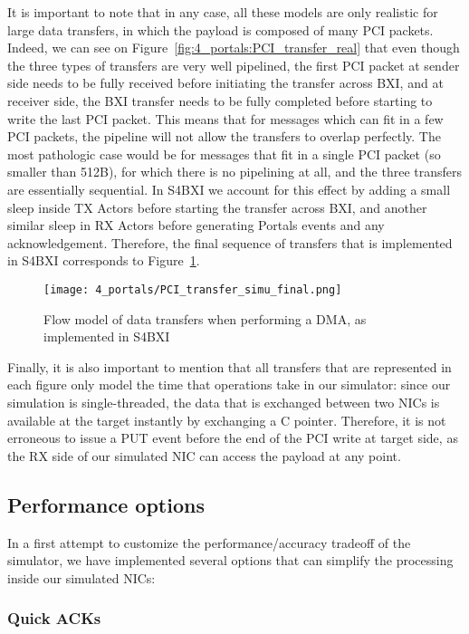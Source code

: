 It is important to note that in any case, all these models are only realistic
for large data transfers, in which the payload is composed of many PCI packets.
Indeed, we can see on Figure~\ref{fig:4_portals:PCI_transfer_real} that even
though the three types of transfers are very well pipelined, the first PCI
packet at sender side needs to be fully received before initiating the transfer
across BXI, and at receiver side, the BXI transfer needs to be fully completed
before starting to write the last PCI packet. This means that for messages which
can fit in a few PCI packets, the pipeline will not allow the transfers to
overlap perfectly. The most pathologic case would be for messages that fit in a
single PCI packet (so smaller than 512B), for which there is no pipelining at
all, and the three transfers are essentially sequential. In S4BXI we account for
this effect by adding a small sleep inside TX Actors before starting the
transfer across BXI, and another similar sleep in RX Actors before generating
Portals events and any acknowledgement. Therefore, the final sequence of
transfers that is implemented in S4BXI corresponds to
Figure~\ref{fig:4_portals:PCI_transfer_simu_final}.

\begin{figure}[!ht]
    \centering
    \texttt{[image: 4\_portals/PCI\_transfer\_simu\_final.png]}
    \caption{Flow model of data transfers when performing a DMA, as implemented in S4BXI}
    \label{fig:4_portals:PCI_transfer_simu_final}
\end{figure}

Finally, it is also important to mention that all transfers that are represented
in each figure only model the time that operations take in our simulator: since
our simulation is single-threaded, the data that is exchanged between two NICs
is available at the target instantly by exchanging a C pointer. Therefore, it is
not erroneous to issue a PUT event before the end of the PCI write at target
side, as the RX side of our simulated NIC can access the payload at any point.

\subsection{Performance options}

In a first attempt to customize the performance/accuracy tradeoff of the
simulator, we have implemented several options that can simplify the processing
inside our simulated NICs:

\subsubsection{Quick ACKs}

